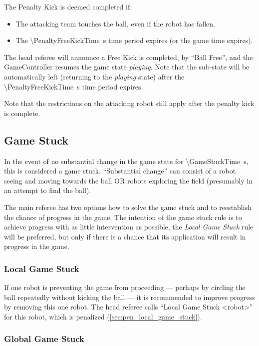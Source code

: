 The Penalty Kick is deemed completed if:
\begin{itemize}
\item The attacking team touches the ball, even if the robot has fallen.
\item The \qty{\PenaltyFreeKickTime}{\second} time period expires (or the game time expires).
\end{itemize}

The head referee will announce a Free Kick is completed, by ``Ball Free'', and the GameController
resumes the game state \emph{playing}. Note that the sub-state will be automatically left (returning to the \textit{playing} state) after the \qty{\PenaltyFreeKickTime}{\second} time period expires.

Note that the restrictions on the attacking robot still apply after the penalty kick is complete.

\subsection{Game Stuck}
\label{sec:game_stuck}

In the event of no substantial change in the game state for \qty{\GameStuckTime}{\second}, this is considered a game stuck.  ``Substantial change'' can consist of a robot seeing and moving towards the ball OR robots exploring the field (presumably in an attempt to find the ball).

The main referee has two options how to solve the game stuck and to reestablish the chance of progress in the game. The intention of the game stuck rule is to achieve progress with as little intervention as possible, \ie the \emph{Local Game Stuck} rule will be preferred, but only if there is a chance that its application will result in progress in the game.

\subsubsection{Local Game Stuck}
\label{sec:game_stuck:local}

If one robot is preventing the game from proceeding --- perhaps by circling the ball repeatedly without kicking the ball --- it is recommended to improve progress by removing this one robot.
The head referee calls ``Local Game Stuck \textless robot\textgreater'' for this robot, which is penalized (\cf \cref{sec:pen_local_game_stuck}).

\subsubsection{Global Game Stuck}
\label{sec:game_stuck:global}

